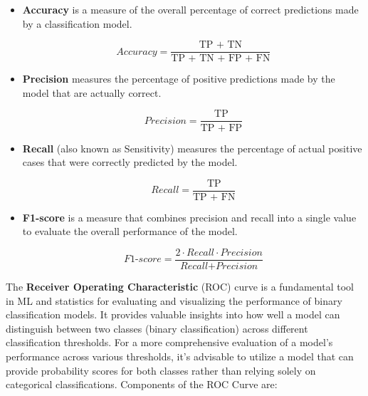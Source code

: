 \begin{itemize}
  \item{

  \textbf{Accuracy} is a measure of the overall percentage of correct predictions made by a classification model.

  \begin{equation}
    \textit{Accuracy} = \frac{\text{TP + TN}}{\text{TP + TN + FP + FN}}
    \label{formula:accuracy}
  \end{equation}

  }
  \item{

  \textbf{Precision} measures the percentage of positive predictions made by the model that are actually correct.

  \begin{equation}
    \textit{Precision} = \frac{\text{TP}}{\text{TP + FP}}
    \label{formula:precision}
  \end{equation}

  }
  \item{

  \textbf{Recall} (also known as Sensitivity)  measures the percentage of actual positive cases that were correctly predicted by the model.

  \begin{equation}
    \textit{Recall} = \frac{\text{TP}}{\text{TP + FN}}
    \label{formula:recall}
  \end{equation}

  }
  \item{

  \textbf{F1-score} is a measure that combines precision and recall into a single value to evaluate the overall performance of the model.


  \begin{equation}
    \textit{F1-score} = \frac{2 \cdot \textit{Recall} \cdot \textit{Precision}}{\textit{Recall} + \textit{Precision}}
    \label{formula:f1}
  \end{equation}
  
  }
\end{itemize} 


The \textbf{Receiver Operating Characteristic} (ROC) curve  is a fundamental tool in ML and statistics for evaluating and visualizing the performance of binary classification models. 
It provides valuable insights into how well a model can distinguish between two classes (binary classification) across different classification thresholds.
For a more comprehensive evaluation of a model's performance across various thresholds, 
it's advisable to utilize a model that can provide probability scores for both classes rather than relying solely on categorical classifications.
Components of the ROC Curve are:

